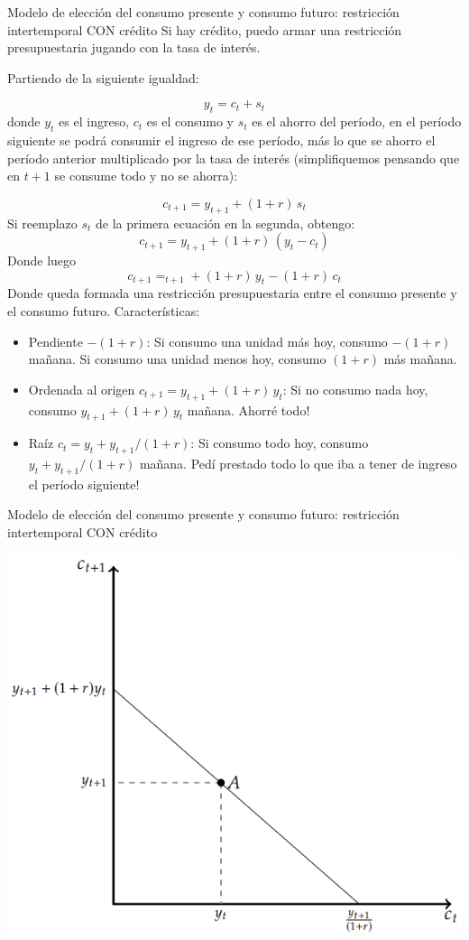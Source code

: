 \documentclass{beamer}
\begin{document}
\begin{frame}{Modelo de elección del consumo presente y consumo futuro: restricción intertemporal CON crédito}
    Si hay crédito, puedo armar una restricción presupuestaria jugando con la tasa de interés.

    Partiendo de la siguiente igualdad:

    \[y_t = c_t + s_t\]
    donde \(y_t\) es el ingreso, \(c_t\) es el consumo y \(s_t\) es el ahorro del período, en el período siguiente se podrá consumir el ingreso de ese período, más lo que se ahorro el período anterior multiplicado por la tasa de interés (simplifiquemos pensando que en $t+1$ se consume todo y no se ahorra):

    \[c_{t+1} = y_{t+1} + (1+r)\,s_t\]
    Si reemplazo $s_t$ de la primera ecuación en la segunda, obtengo:
    \[c_{t+1} = y_{t+1} + (1+r)\,(y_t - c_t)\]
    Donde luego
    \[c_{t+1} = _{t+1} + (1+r)\,y_t - (1+r)\,c_t\]
    Donde queda formada una restricción presupuestaria entre el consumo presente y el consumo futuro. Características:
    \begin{itemize}
        \item Pendiente $-(1+r)$: Si consumo una unidad más hoy, consumo $-(1+r)$ mañana. Si consumo una unidad menos hoy, consumo $(1+r)$ más mañana.
        \item Ordenada al origen $c_{t+1} = y_{t+1} + (1+r)\,y_t$: Si no consumo nada hoy, consumo $y_{t+1} + (1+r)\,y_t$ mañana. Ahorré todo!
        \item Raíz $c_t = y_t + y_{t+1}/(1+r)$: Si consumo todo hoy, consumo $y_t + y_{t+1}/(1+r)$ mañana. Pedí prestado todo lo que iba a tener de ingreso el período siguiente!
    \end{itemize}

\end{frame}


\begin{frame}{Modelo de elección del consumo presente y consumo futuro: restricción intertemporal CON crédito}
    \begin{center}
        \includegraphics[scale=0.65]{../Figures/C35.5.png}
    \end{center} 
\end{frame}
\end{document}
